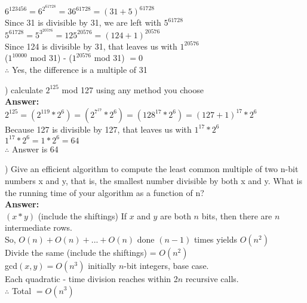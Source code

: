 \documentclass{article}
\begin{document}
\indent $6^{123456} = 6^{2^61728} = 36^{61728} = (31 + 5)^{61728}$ \\
\indent Since 31 is divisible by 31, we are left with $5^{61728}$ \\
\indent $5^{61728} = 5^{3^{20576}} = 125^{20576} = (124 + 1)^{20576}$ \\
\indent Since 124 is divisible by 31, that leaves us with $1^{20576}$ \\

\indent ($1^{10000}$ mod 31) - ($1^{20576}$ mod 31) $= 0$ \\
\indent $\therefore$ Yes, the difference is a multiple of 31

\vspace{.3in}
) calculate $2^{125}$ mod 127 using any method you choose \\
\vspace{.1in}
{\bf Answer:} \\
\indent $2^{125} = (2^{119}* 2^6) = (2^{7^{17}}* 2^6) = (128^{17}* 2^6) = (127 + 1)^{17}*2^6$ \\
\indent Because 127 is divisible by 127, that leaves us with $1^{17}*2^6$ \\
\indent $1^{17}*2^6 = 1 * 2^6 = 64$ \\

\indent $\therefore$ Answer is 64

\vspace{.3in}
) Give an efficient algorithm to compute the least common multiple of two 
\indent n-bit numbers x and y, that is, the smallest number divisible by both x and 
\indent y. What is the running time of your algorithm as a function of n? \\
\vspace{.1in}
{\bf Answer:} \\
\indent $(x * y)$ (include the shiftings) If $x$ and $y$ are both $n$ bits, then there are $n$ \\
\indent intermediate rows. \\
\indent So, $O(n) + O(n) + . . . +O(n)$ done $(n - 1)$ times yields $O(n^2)$ \\
\indent Divide the same (include the shiftings) = $O(n^2)$ \\

\indent gcd$(x, y) = O(n^3)$ initially $n$-bit integers, base case. \\
\indent Each quadratic - time division reaches within 2$n$ recursive calls. \\
\indent $\therefore$ Total $= O(n^3)$
\end{document}
